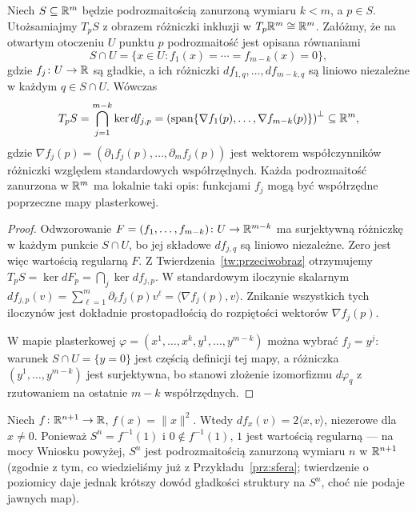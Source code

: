 \begin{stwierdzenie}
\label{stw:styczna-normalne-euklidesowe}
Niech $S\subseteq\mathbb{R}^m$ będzie podrozmaitością zanurzoną wymiaru
$k<m$, a $p\in S$. Utożsamiajmy $T_pS$ z obrazem różniczki inkluzji
w $T_p\mathbb{R}^m\cong\mathbb{R}^m$. Załóżmy, że na otwartym otoczeniu $U$ punktu $p$
podrozmaitość jest opisana równaniami
\[
S\cap U=\{x\in U:f_1(x)=\cdots=f_{m-k}(x)=0\},
\]
gdzie $f_j\colon U\to\mathbb{R}$ są gładkie, a ich różniczki
$df_{1,q},\ldots,df_{m-k,q}$ są liniowo niezależne w każdym
$q\in S\cap U$. Wówczas
\[
T_pS=\bigcap_{j=1}^{m-k}\ker df_{j,p}
=\left(\operatorname{span}\{\nabla f_1(p),\ldots,
\nabla f_{m-k}(p)\}\right)^\perp\subseteq\mathbb{R}^m,
\]
gdzie $\nabla f_j(p)=
(\partial_1f_j(p),\ldots,\partial_mf_j(p))$ jest wektorem
współczynników różniczki względem standardowych współrzędnych.
Każda podrozmaitość zanurzona w $\mathbb{R}^m$ ma lokalnie taki opis:
funkcjami $f_j$ mogą być współrzędne poprzeczne mapy plasterkowej.
\end{stwierdzenie}
\begin{proof}
Odwzorowanie $F=(f_1,\ldots,f_{m-k})\colon U\to\mathbb{R}^{m-k}$
ma surjektywną różniczkę w każdym punkcie $S\cap U$,
bo jej składowe $df_{j,q}$ są liniowo niezależne. Zero jest więc
wartością regularną $F$. Z Twierdzenia~\ref{tw:przeciwobraz}
otrzymujemy $T_pS=\ker dF_p=\bigcap_j\ker df_{j,p}$.
W standardowym iloczynie skalarnym
$df_{j,p}(v)=\sum_{\ell=1}^m\partial_\ell f_j(p)v^\ell
=\langle\nabla f_j(p),v\rangle$.
Znikanie wszystkich tych iloczynów jest dokładnie prostopadłością
do rozpiętości wektorów $\nabla f_j(p)$.

W mapie plasterkowej $\varphi=(x^1,\ldots,x^k,y^1,\ldots,y^{m-k})$
można wybrać $f_j=y^j$: warunek $S\cap U=\{y=0\}$ jest częścią
definicji tej mapy, a różniczka $(y^1,\ldots,y^{m-k})$ jest
surjektywna, bo stanowi złożenie izomorfizmu $d\varphi_q$
z rzutowaniem na ostatnie $m-k$ współrzędnych.
\end{proof}

\begin{przyklad}
Niech $f\colon\mathbb{R}^{n+1}\to\mathbb{R}$, $f(x)=\|x\|^2$. Wtedy $df_x(v)=2\langle x,v\rangle$, niezerowe
dla $x\neq0$. Ponieważ $S^n=f^{-1}(1)$ i $0\notin f^{-1}(1)$, $1$ jest wartością regularną
— na mocy Wniosku powyżej, $S^n$ jest podrozmaitością zanurzoną wymiaru $n$ w $\mathbb{R}^{n+1}$
(zgodnie z tym, co wiedzieliśmy już z Przykładu~\ref{prz:sfera}; twierdzenie o poziomicy
daje jednak krótszy dowód gładkości struktury na $S^n$, choć nie podaje jawnych map).
\end{przyklad}

